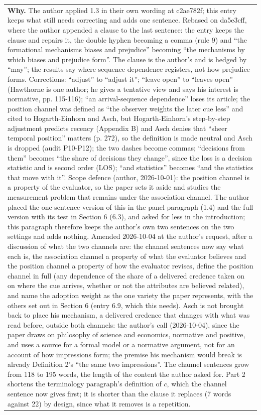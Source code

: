 \documentclass[10pt]{article}
\theoremstyle{definition}
\newlength{\fullw}\setlength{\fullw}{25.9cm}
\begin{document}
{\begin{longtable}{|p{0.9cm}|p{12.2cm}|p{12.2cm}|}
\multicolumn{3}{|p{\fullw}|}{\textbf{Why.} The author applied 1.3 in their own wording at c2ae782f; this entry keeps what still needs correcting and adds one sentence. Rebased on da5e3cff, where the author appended a clause to the last sentence: the entry keeps the clause and repairs it, the double hyphen becoming a comma (rule 9) and ``the formational mechanisms biases and prejudice'' becoming ``the mechanisms by which biases and prejudice form''. The clause is the author's and is hedged by ``may''; the results say where sequence dependence registers, not how prejudice forms. Corrections: ``adjust'' to ``adjust it''; ``leave open'' to ``leaves open'' (Hawthorne is one author; he gives a tentative view and says his interest is normative, pp. 115-116); ``an arrival-sequence dependence'' loses its article; the position channel was defined as ``the observer weights the later cue less'' and cited to Hogarth-Einhorn and Asch, but Hogarth-Einhorn's step-by-step adjustment predicts recency (Appendix B) and Asch denies that ``sheer temporal position'' matters (p. 272), so the definition is made neutral and Asch is dropped (audit P10-P12); the two dashes become commas; ``decisions from them'' becomes ``the share of decisions they change'', since the loss is a decision statistic and is second order (LOS); ``and statistics'' becomes ``and the statistics that move with it''. Scope defence (author, 2026-10-01): the position channel is a property of the evaluator, so the paper sets it aside and studies the measurement problem that remains under the association channel. The author placed the one-sentence version of this in the panel paragraph (1.4) and the full version with its test in Section 6 (6.3), and asked for less in the introduction; this paragraph therefore keeps the author's own two sentences on the two settings and adds nothing. Amended 2026-10-04 at the author's request, after a discussion of what the two channels are: the channel sentences now say what each is, the association channel a property of what the evaluator believes and the position channel a property of how the evaluator revises, define the position channel in full (any dependence of the share of a delivered credence taken on on where the cue arrives, whether or not the attributes are believed related), and name the adoption weight as the one variety the paper represents, with the others set out in Section 6 (entry 6.9, which this needs). Asch is not brought back to place his mechanism, a delivered credence that changes with what was read before, outside both channels: the author's call (2026-10-04), since the paper draws on philosophy of science and economics, normative and positive, and uses a source for a formal model or a normative argument, not for an account of how impressions form; the premise his mechanism would break is already Definition 2's ``the same two impressions''. The channel sentences grow from 118 to 195 words, the length of the content the author asked for. Part 2 shortens the terminology paragraph's definition of $c$, which the channel sentence now gives first; it is shorter than the clause it replaces (7 words against 22) by design, since what it removes is a repetition.} \\

\end{longtable}}
\end{document}
